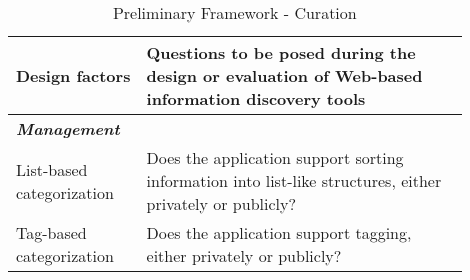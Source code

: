 \begin{table*}[htbp]
\caption{Preliminary Framework - Curation}
\centering
\label{table:old_framework_curation}
\footnotesize
\begin{tabular}{|p{0.25\linewidth}|p{0.65\linewidth}|}
\hline
\textbf{\small{Design factors}}   & \textbf{\small{Questions to be posed during the design or evaluation of Web-based information discovery tools 
}}  \\

\hline          
\emph{\textbf{Management}}                    &                                                                                                           \\
List-based categorization               & Does the application support sorting information into list-like structures, either privately or publicly?                                                  \\
Tag-based categorization               & Does the application support tagging, either privately or publicly?                                                  \\


\end{tabular}
\end{table*}
